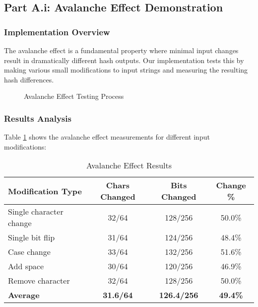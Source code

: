 \documentclass[12pt,a4paper]{article}
\begin{document}
\subsection{Part A.i: Avalanche Effect Demonstration}

\subsubsection{Implementation Overview}

The avalanche effect is a fundamental property where minimal input changes result in dramatically different hash outputs. Our implementation tests this by making various small modifications to input strings and measuring the resulting hash differences.

\begin{figure}[h]
\centering
{}
\caption{Avalanche Effect Testing Process}
\end{figure}

\subsubsection{Results Analysis}

Table \ref{tab:avalanche-results} shows the avalanche effect measurements for different input modifications:

\begin{table}[h]
\centering
\begin{tabularx}{\textwidth}{|X|c|c|c|}
\hline
\textbf{Modification Type} & \textbf{Chars Changed} & \textbf{Bits Changed} & \textbf{Change \%} \\
\hline
Single character change & 32/64 & 128/256 & 50.0\% \\
\hline
Single bit flip & 31/64 & 124/256 & 48.4\% \\
\hline
Case change & 33/64 & 132/256 & 51.6\% \\
\hline
Add space & 30/64 & 120/256 & 46.9\% \\
\hline
Remove character & 32/64 & 128/256 & 50.0\% \\
\hline
\textbf{Average} & \textbf{31.6/64} & \textbf{126.4/256} & \textbf{49.4\%} \\
\hline
\end{tabularx}
\caption{Avalanche Effect Results}
\label{tab:avalanche-results}
\end{table}
\end{document}

